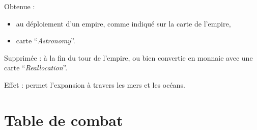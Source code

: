 \documentclass[a4paper,twocolumn]{article}
\newenvironment{texte}{\rmfamily\footnotesize}{}
\newcommand{\carte}[1]{``\textit{#1}''}
\begin{document}
\begin{texte}
      Obtenue :
      \begin{itemize}
      \item au déploiement d'un empire, comme indiqué sur la carte de l'empire,
      \item carte \carte{Astronomy}.
      \end{itemize}

      Supprimée : à la fin du tour de l'empire, ou bien convertie en
      monnaie avec une carte \carte{Reallocation}.

      Effet : permet l'expansion à travers les mers et les océans.

\section{Table de combat}


\end{texte}
\end{document}
